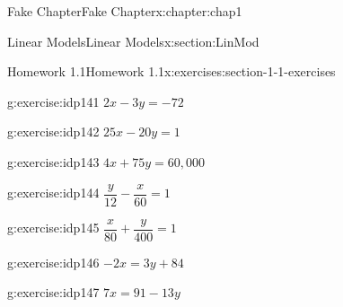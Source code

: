 \documentclass[oneside,10pt,]{book}
\numberwithin{equation}{section}
\begin{document}
\begin{chapterptx}{Fake Chapter}{}{Fake Chapter}{}{}{x:chapter:chap1}
\begin{sectionptx}{Linear Models}{}{Linear Models}{}{}{x:section:LinMod}
\begin{exercises-subsection}{Homework 1.1}{}{Homework 1.1}{}{}{x:exercises:section-1-1-exercises}
\begin{exercisegroupcol}{2}
\begin{divisionexerciseegcol}{46}{}{}{g:exercise:idp141}%
\(2x - 3y = -72\)%
\end{divisionexerciseegcol}%
\begin{divisionexerciseegcol}{47}{}{}{g:exercise:idp142}%
\(25x - 20y = 1\)%
\end{divisionexerciseegcol}%
\begin{divisionexerciseegcol}{48}{}{}{g:exercise:idp143}%
\(4x + 75y = 60,000\)%
\end{divisionexerciseegcol}%
\begin{divisionexerciseegcol}{49}{}{}{g:exercise:idp144}%
\(\dfrac{y}{12} - \dfrac{x}{60}= 1\)%
\end{divisionexerciseegcol}%
\begin{divisionexerciseegcol}{50}{}{}{g:exercise:idp145}%
\(\dfrac{x}{80} + \dfrac{y}{400}= 1\)%
\end{divisionexerciseegcol}%
\begin{divisionexerciseegcol}{51}{}{}{g:exercise:idp146}%
\(-2x = 3y + 84\)%
\end{divisionexerciseegcol}%
\begin{divisionexerciseegcol}{52}{}{}{g:exercise:idp147}%
\(7x = 91 - 13y\)%
\end{divisionexerciseegcol}%
\end{exercisegroupcol}
\par\medskip\noindent
\end{exercises-subsection}
\end{sectionptx}
\end{chapterptx}
\end{document}
